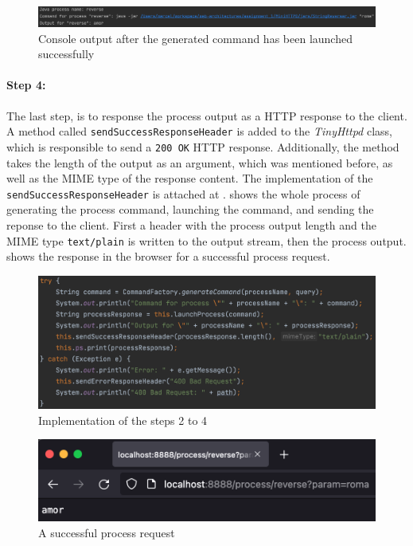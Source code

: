 \begin{figure}[h]
\centering
\includegraphics[scale=0.3]{images/implementationOutput}
\caption{Console output after the generated command has been launched successfully}
\label{fig:01_part1_impl_output}
\end{figure}


\paragraph{Step 4:}
The last step, is to response the process output as a HTTP response to the client.
A method called \texttt{sendSuccessResponseHeader} is added to the \textit{TinyHttpd} class, which is responsible to send a \texttt{200 OK} HTTP response. Additionally, the method takes the length of the output as an argument, which was mentioned before, as well as the MIME type of the response content. The implementation of the \texttt{sendSuccessResponseHeader} is attached at .
 shows the whole process of generating the process command, launching the command, and sending the reponse to the client. First a header with the process output length and the MIME type \texttt{text/plain} is written to the output stream, then the process output.  shows the response in the browser for a successful process request.

\begin{figure}[h]
\centering
\includegraphics[scale=0.45]{images/wholeProcess}
\caption{Implementation of the steps 2 to 4}
\label{fig:01_part1_impl_all_steps}
\end{figure}

\begin{figure}[h]
\centering
\includegraphics[scale=0.6]{images/part1Success}
\caption{A successful process request}
\label{fig:01_part1_impl_success}
\end{figure}


